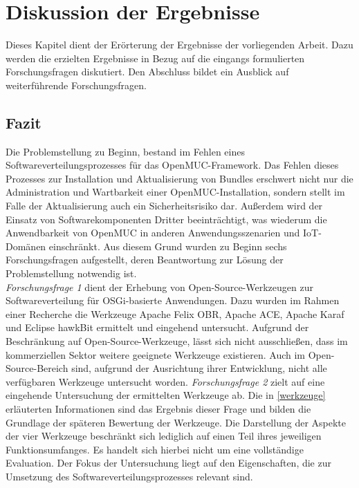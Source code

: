 \chapter{Diskussion der Ergebnisse}
\label{cha:discussion}

Dieses Kapitel dient der Erörterung der Ergebnisse der vorliegenden Arbeit.
Dazu werden die erzielten Ergebnisse in Bezug auf die eingangs formulierten Forschungsfragen diskutiert. %
Den Abschluss bildet ein Ausblick auf weiterführende Forschungsfragen.

\section{Fazit}

Die Problemstellung zu Beginn, bestand im Fehlen eines Softwareverteilungsprozesses für das OpenMUC-Framework.
Das Fehlen dieses Prozesses zur Installation und Aktualisierung von Bundles erschwert nicht nur die Administration und Wartbarkeit einer OpenMUC-Installation,
sondern stellt im Falle der Aktualisierung auch ein Sicherheitsrisiko dar.
Außerdem wird der Einsatz von Softwarekomponenten Dritter beeinträchtigt,
was wiederum die Anwendbarkeit von OpenMUC in anderen Anwendungsszenarien und \ac{IoT}-Domänen einschränkt.
Aus diesem Grund wurden zu Beginn sechs Forschungsfragen aufgestellt, deren Beantwortung zur Lösung der Problemstellung notwendig ist.\\

\textit{Forschungsfrage 1} dient der Erhebung von Open-Source-Werkzeugen zur Softwareverteilung für \ac{OSGi}-basierte Anwendungen.
Dazu wurden im Rahmen einer Recherche die Werkzeuge Apache Felix OBR, Apache ACE, Apache Karaf und Eclipse hawkBit ermittelt und eingehend untersucht.
Aufgrund der Beschränkung auf Open-Source-Werkzeuge, lässt sich nicht ausschließen, dass im kommerziellen Sektor weitere geeignete Werkzeuge existieren.
Auch im Open-Source-Bereich sind, aufgrund der Ausrichtung ihrer Entwicklung, nicht alle verfügbaren Werkzeuge untersucht worden.
\textit{Forschungsfrage 2} zielt auf eine eingehende Untersuchung der ermittelten Werkzeuge ab.
Die in \autoref{werkzeuge} erläuterten Informationen sind das Ergebnis dieser Frage und bilden die Grundlage der späteren Bewertung der Werkzeuge.
Die Darstellung der Aspekte der vier Werkzeuge beschränkt sich lediglich auf einen Teil ihres jeweiligen Funktionsumfanges.
Es handelt sich hierbei nicht um eine vollständige Evaluation.
Der Fokus der Untersuchung liegt auf den Eigenschaften, die zur Umsetzung des Softwareverteilungsprozesses relevant sind.\\


